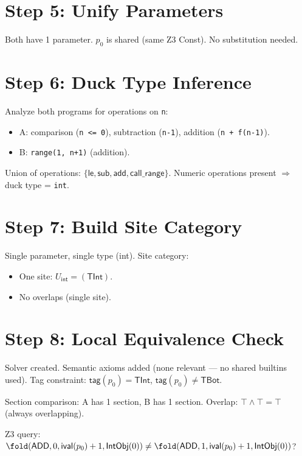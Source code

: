 \section{Step 5: Unify Parameters}

Both have 1 parameter.  $p_0$ is shared (same Z3 Const).
No substitution needed.

\section{Step 6: Duck Type Inference}

Analyze both programs for operations on \texttt{n}:
\begin{itemize}
  \item A: comparison (\texttt{n <= 0}), subtraction (\texttt{n-1}),
    addition (\texttt{n + f(n-1)}).
  \item B: \texttt{range(1, n+1)} (addition).
\end{itemize}

Union of operations: $\{\mathsf{le}, \mathsf{sub}, \mathsf{add},
\mathsf{call\_range}\}$.  Numeric operations present $\Rightarrow$
duck type = \texttt{int}.

\section{Step 7: Build Site Category}

Single parameter, single type (int).  Site category:
\begin{itemize}
  \item One site: $U_\mathsf{int} = (\mathsf{TInt})$.
  \item No overlaps (single site).
\end{itemize}

\section{Step 8: Local Equivalence Check}

Solver created.  Semantic axioms added (none relevant --- no shared
builtins used).  Tag constraint: $\mathsf{tag}(p_0) = \mathsf{TInt}$,
$\mathsf{tag}(p_0) \neq \mathsf{TBot}$.

Section comparison: A has 1 section, B has 1 section.
Overlap: $\top \land \top = \top$ (always overlapping).

Z3 query: $\fold(\mathsf{ADD}, 0, \mathsf{ival}(p_0)+1,
\mathsf{IntObj}(0)) \neq \fold(\mathsf{ADD}, 1,
\mathsf{ival}(p_0)+1, \mathsf{IntObj}(0))$?

